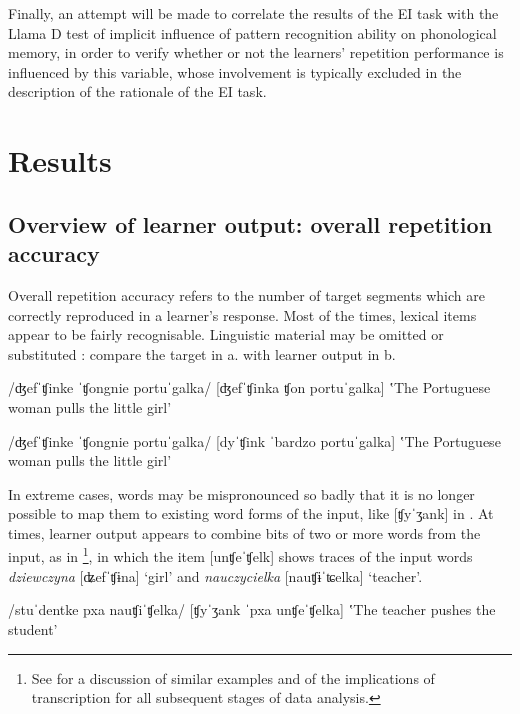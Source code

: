 Finally, an attempt will be made to correlate the results of the EI task with the Llama D test of implicit influence of pattern recognition ability on phonological memory, in order to verify whether or not the learners’ repetition performance is influenced by this variable, whose involvement is typically excluded in the description of the rationale of the EI task.

\section{Results}\label{sec:04:2}

\subsection{Overview of learner output: overall repetition accuracy}\label{sec:04:2.1}

Overall repetition accuracy refers to the number of target segments which are correctly reproduced in a learner’s response. Most of the times, lexical items appear to be fairly recognisable. Linguistic material may be omitted  or substituted : compare the target in a. with learner output in b. 

\ea%
    \label{ex:04:1}
    \ea\label{ex:04:1a}
    /ʤefˈʧinke ˈʧongnie portuˈgalka/
    \ex\label{ex:04:1b}
    [ʤefˈʧinka ʧon portuˈgalka]
    \glt ‛The Portuguese woman pulls the little girl'
    \z
\z

\ea%
    \label{ex:04:2}
    \ea\label{ex:04:2a}
    /ʤefˈʧinke ˈʧongnie portuˈgalka/
    \ex\label{ex:04:2b}
    [dyˈʧink ˈbardzo portuˈgalka]
    \glt ‛The Portuguese woman pulls the little girl'
    \z
\z

  In extreme cases, words may be mispronounced so badly that it is no longer possible to map them to existing word forms of the input, like [ʧyˈʒank] in . At times, learner output appears to combine bits of two or more words from the input, as in \footnote{See \citet{Saturno2015} for a discussion of similar examples and of the implications of transcription for all subsequent stages of data analysis.}, in which the item [unʧeˈʧelk] shows traces of the input words \textit{dziewczyna} [ʥefˈʧɨna] ‘girl’ and \textit{nauczycielka} [nauʧɨˈʨelka] ‘teacher’.

\ea%
    \label{ex:04:3}
    \ea\label{ex:04:3a}
    /stuˈdentke pxa nauʧiˈʧelka/
    \ex\label{ex:04:3b}
    [ʧyˈʒank ˈpxa unʧeˈʧelka]
    \glt ‛The teacher pushes the student'
    \z
\z

